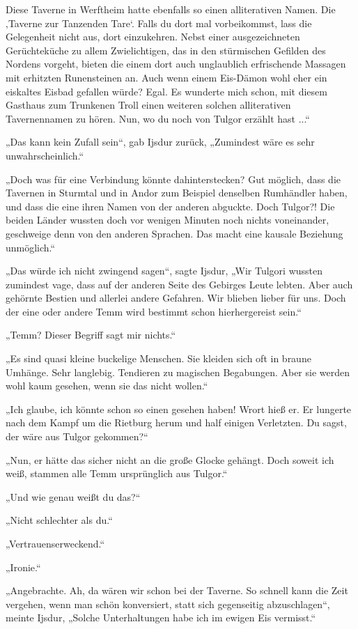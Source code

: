 Diese Taverne in Werftheim hatte ebenfalls so einen alliterativen Namen. Die ‚Taverne zur Tanzenden Tare‘. Falls du dort mal vorbeikommst, lass die Gelegenheit nicht aus, dort einzukehren. Nebst einer ausgezeichneten Gerüchteküche zu allem Zwielichtigen, das in den stürmischen Gefilden des Nordens vorgeht, bieten die einem dort auch unglaublich erfrischende Massagen mit erhitzten Runensteinen an. Auch wenn einem Eis-Dämon wohl eher ein eiskaltes Eisbad gefallen würde? Egal. Es wunderte mich schon, mit diesem Gasthaus zum Trunkenen Troll einen weiteren solchen alliterativen Tavernennamen zu hören. Nun, wo du noch von Tulgor erzählt hast ...“

„Das kann kein Zufall sein“, gab Ijsdur zurück, „Zumindest wäre es sehr unwahrscheinlich.“

„Doch was für eine Verbindung könnte dahinterstecken? Gut möglich, dass die Tavernen in Sturmtal und in Andor zum Beispiel denselben Rumhändler haben, und dass die eine ihren Namen von der anderen abguckte. Doch Tulgor?! Die beiden Länder wussten doch vor wenigen Minuten noch nichts voneinander, geschweige denn von den anderen Sprachen. Das macht eine kausale Beziehung unmöglich.“

„Das würde ich nicht zwingend sagen“, sagte Ijsdur, „Wir Tulgori wussten zumindest vage, dass auf der anderen Seite des Gebirges Leute lebten. Aber auch gehörnte Bestien und allerlei andere Gefahren. Wir blieben lieber für uns. Doch der eine oder andere Temm wird bestimmt schon hierhergereist sein.“

„Temm? Dieser Begriff sagt mir nichts.“

„Es sind quasi kleine buckelige Menschen. Sie kleiden sich oft in braune Umhänge. Sehr langlebig. Tendieren zu magischen Begabungen. Aber sie werden wohl kaum gesehen, wenn sie das nicht wollen.“

„Ich glaube, ich könnte schon so einen gesehen haben! Wrort hieß er. Er lungerte nach dem Kampf um die Rietburg herum und half einigen Verletzten. Du sagst, der wäre aus Tulgor gekommen?“

„Nun, er hätte das sicher nicht an die große Glocke gehängt. Doch soweit ich weiß, stammen alle Temm ursprünglich aus Tulgor.“

„Und wie genau weißt du das?“

„Nicht schlechter als du.“

„Vertrauenserweckend.“

„Ironie.“

„Angebrachte. Ah, da wären wir schon bei der Taverne. So schnell kann die Zeit vergehen, wenn man schön konversiert, statt sich gegenseitig abzuschlagen“, meinte Ijsdur, „Solche Unterhaltungen habe ich im ewigen Eis vermisst.“

